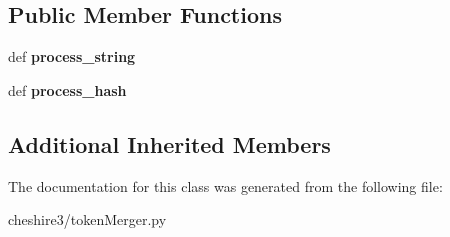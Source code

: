 \subsection*{Public Member Functions}
\begin{DoxyCompactItemize}
\item 
\hypertarget{classcheshire3_1_1token_merger_1_1_simple_token_merger_a19e5bf49bd4827316cfba49ac28c0f2f}{def {\bfseries process\-\_\-string}}\label{classcheshire3_1_1token_merger_1_1_simple_token_merger_a19e5bf49bd4827316cfba49ac28c0f2f}

\item 
\hypertarget{classcheshire3_1_1token_merger_1_1_simple_token_merger_acda18065dfb4e9affcfaa9170095763c}{def {\bfseries process\-\_\-hash}}\label{classcheshire3_1_1token_merger_1_1_simple_token_merger_acda18065dfb4e9affcfaa9170095763c}

\end{DoxyCompactItemize}
\subsection*{Additional Inherited Members}


The documentation for this class was generated from the following file\-:\begin{DoxyCompactItemize}
\item 
cheshire3/token\-Merger.\-py\end{DoxyCompactItemize}

